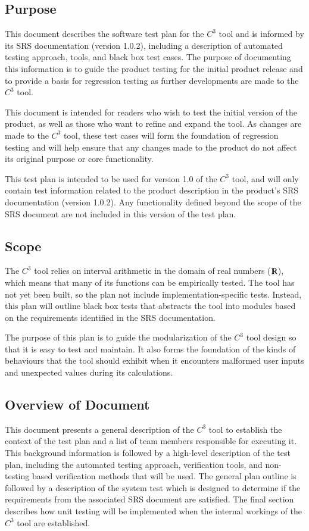 \documentclass[12pt, titlepage]{article}
\newcommand{\prognameAbbrv}{$C^{3}$}
\newcommand{\srsVersion}{1.0.2}
\begin{document}
\subsection{Purpose}
This document describes the software test plan for the \prognameAbbrv{} tool 
and is informed by its SRS documentation (version \srsVersion{}), including a 
description of automated testing approach, tools, and black box test cases. The 
purpose of documenting this information is to guide the product testing for the 
initial product release and to provide a basis for regression testing as 
further developments are made to the \prognameAbbrv{} tool.

This document is intended for readers who wish to test the initial version of 
the product, as well as those who want to refine and expand the tool. As 
changes are made to the \prognameAbbrv{} tool, these test cases will form the 
foundation of regression testing and will help ensure that any changes made to 
the product do not affect its original purpose or core functionality.

This test plan is intended to be used for version 1.0 of the \prognameAbbrv{} 
tool, and will only contain test information related to the product description 
in the product's SRS documentation (version \srsVersion{}). Any functionality 
defined beyond the scope of the SRS document are not included in this version 
of the test plan.

\subsection{Scope}
The \prognameAbbrv{} tool relies on interval arithmetic in the domain of real 
numbers ($\varmathbb{R}$), which means that many of its functions can be 
empirically tested. The tool has not yet been built, so the plan not include 
implementation-specific tests. Instead, this plan will outline black box tests 
that abstracts the tool into modules based on the requirements identified in 
the SRS documentation.

The purpose of this plan is to guide the modularization of the \prognameAbbrv{} 
tool design so that it is easy to test and maintain. It also forms the 
foundation of the kinds of behaviours that the tool should exhibit when it 
encounters malformed  user inputs and unexpected values during its calculations.

\subsection{Overview of Document}
This document presents a general description of the \prognameAbbrv{} tool to 
establish the context of the test plan and a list of team members responsible 
for executing it. This background information is followed by a high-level 
description of the test plan, including the automated testing approach, 
verification tools, and non-testing based verification methods that will be 
used. The general plan outline is followed by a description of the system test 
which is designed to determine if the requirements from the associated SRS 
document are satisfied. The final section describes how unit testing will be 
implemented when the internal workings of the \prognameAbbrv{} tool are 
established.
\end{document}

